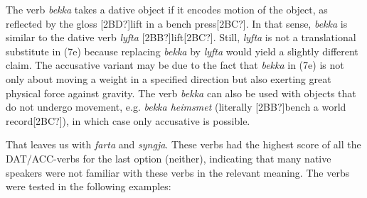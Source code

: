 \begin{styleStandard}
The verb \textit{bekka} takes a dative object if it encodes motion of the object, as reflected by the gloss [2BD?]lift in a bench press[2BC?]. In that sense, \textit{bekka} is similar to the dative verb \textit{lyfta} [2BB?]lift[2BC?]. Still, \textit{lyfta} is not a translational substitute in (7e) because replacing \textit{bekka} by \textit{lyfta} would yield a slightly different claim. The accusative variant may be due to the fact that \textit{bekka} in (7e) is not only about moving a weight in a specified direction but also exerting great physical force against gravity. The verb \textit{bekka} can also be used with objects that do not undergo movement, e.g. \textit{bekka heimsmet} (literally [2BB?]bench a world record[2BC?]), in which case only accusative is possible. 
\end{styleStandard}

\begin{styleStandard}
That leaves us with \textit{farta} and \textit{syngja}. These verbs had the highest score of all the DAT/ACC-verbs for the last option (neither), indicating that many native speakers were not familiar with these verbs in the relevant meaning. The verbs were tested in the following examples: 
\end{styleStandard}

